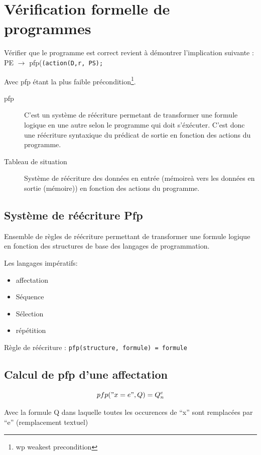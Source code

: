 \documentclass[12pt,a4paper,openany]{book}
\begin{document}
		\chapter{Vérification formelle de programmes}\label{pfp}
	Vérifier que le programme est correct revient à démontrer l'implication suivante :\\ PE $\rightarrow$ pfp(\texttt{(action(D,r, PS);}

	Avec pfp étant la plus faible précondition\footnote{wp weakest precondition}.
	\begin{description}
		\item[pfp]	C'est un système de réécriture permetant de transformer une formule logique en une autre selon le programme qui doit s'éxécuter.
			C'est donc une réécriture syntaxique du prédicat de sortie en fonction des actions du programme.  \item[Tableau de situation] Système de réécriture des données en entrée (mémoireà vers les données en sortie (mémoire)) en fonction des actions du programme.  \end{description}
	\section{Système de réécriture Pfp}
		Ensemble de règles de réécriture permettant de transformer une formule logique en fonction des structures de base des langages de programmation.

		Les langages impératifs:
			\begin{itemize}
				\item affectation
				\item Séquence
				\item Sélection
				\item répétition
			\end{itemize}

		Règle de réécriture : \texttt{pfp(structure, formule) = formule}

	\section{Calcul de pfp d'une affectation}
	$$pfp("x=e", Q) = Q^e_n$$

	Avec la formule Q dans laquelle toutes les occurences de ``x'' sont remplacées par ``e'' (remplacement textuel)
\end{document}
